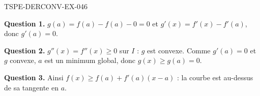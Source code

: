 \begin{corrige}{TSPE-DERCONV-EX-046}

\textbf{Question 1.} $g(a) = f(a) - f(a) - 0 = 0$ et $g'(x) = f'(x) - f'(a)$, donc $g'(a) = 0$.


\textbf{Question 2.} $g''(x) = f''(x) \geq 0$ sur $I$ : $g$ est convexe. Comme $g'(a) = 0$ et $g$ convexe, $a$ est un minimum global, donc $g(x) \geq g(a) = 0$.

\textbf{Question 3.} Ainsi $f(x) \geq f(a) + f'(a)(x-a)$ : la courbe est au-dessus de sa tangente en $a$.

\end{corrige}
